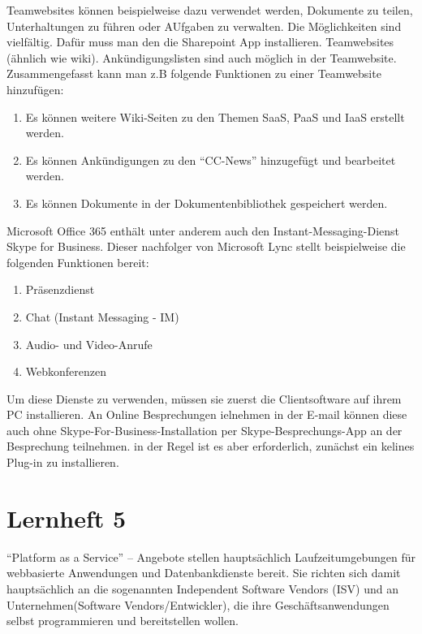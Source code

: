\documentclass[a4paper,10pt]{article}
\begin{document}
\vspace{3mm}
Teamwebsites können beispielweise dazu verwendet werden, Dokumente zu teilen, Unterhaltungen zu führen oder AUfgaben zu verwalten. Die Möglichkeiten sind vielfältig. Dafür muss man den die Sharepoint App installieren. Teamwebsites (ähnlich wie wiki). Ankündigungslisten sind auch möglich in der Teamwebsite. Zusammengefasst kann man z.B folgende Funktionen zu einer Teamwebsite hinzufügen:
\begin{enumerate}
	\item Es können weitere Wiki-Seiten zu den Themen SaaS, PaaS und IaaS erstellt werden.
	\item Es können Ankündigungen zu den ``CC-News'' hinzugefügt und bearbeitet werden.
	\item Es können Dokumente in der Dokumentenbibliothek gespeichert werden.
\end{enumerate}
\vspace{3mm}
Microsoft Office 365 enthält unter anderem auch den Instant-Messaging-Dienst Skype for Business. Dieser nachfolger von Microsoft Lync stellt beispielweise die folgenden Funktionen bereit:
\begin{enumerate}
	\item Präsenzdienst
	\item Chat (Instant Messaging - IM)
	\item Audio- und Video-Anrufe
	\item Webkonferenzen
\end{enumerate}
Um diese Dienste zu verwenden, müssen sie zuerst die Clientsoftware auf ihrem PC installieren.  An Online Besprechungen ielnehmen in der E-mail können diese auch ohne Skype-For-Business-Installation per Skype-Besprechungs-App an der Besprechung teilnehmen. in der Regel ist es aber erforderlich, zunächst ein kelines Plug-in zu installieren.
\part{Lernheft 5}
``Platform as a Service'' -- Angebote stellen hauptsächlich Laufzeitumgebungen für webbasierte Anwendungen und Datenbankdienste bereit. Sie richten sich damit hauptsächlich an die sogenannten Independent Software Vendors (ISV) und an Unternehmen(Software Vendors/Entwickler), die ihre Geschäftsanwendungen selbst programmieren und bereitstellen wollen. \newline
\end{document}
